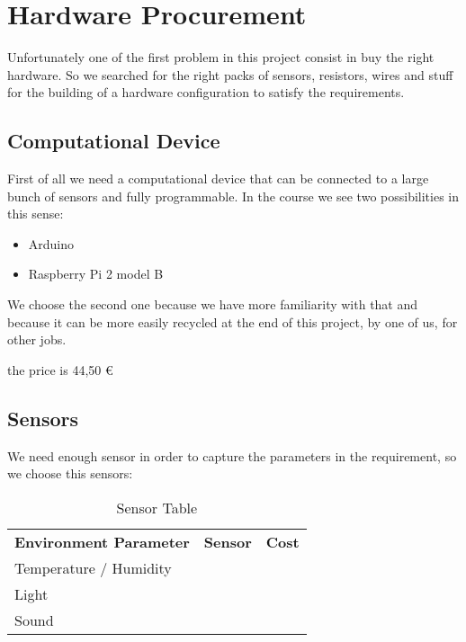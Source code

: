 \section{Hardware Procurement}

Unfortunately one of the first problem in this project consist in buy the right hardware. So we searched for the right packs of sensors, resistors, wires and stuff for the building of a hardware configuration to satisfy the requirements.

\subsection{Computational Device}

First of all we need a computational device that can be connected to a large bunch of sensors and fully programmable. In the course we see two possibilities in this sense:
\begin{itemize}
  \item Arduino
  \item Raspberry Pi 2 model B
\end{itemize}

We choose the second one because we have more familiarity with that and because it can be more easily recycled at the end of this project, by one of us, for other jobs.

the price is 44,50 \euro

\subsection{Sensors}

We need enough sensor in order to capture the parameters in the requirement, so we choose this sensors:

\begin{table}[]
\centering
\begin{tabular}{lll}
\cline{1-1}
\multicolumn{1}{|c|}{\textbf{Environment Parameter}} & \multicolumn{1}{c}{\textbf{Sensor}} & \multicolumn{1}{c}{\textbf{Cost}} \\ \cline{1-1}
Temperature / Humidity                               &                                     &                                   \\
Light                                                &                                     &                                   \\
Sound                                                &                                     &                                  
\end{tabular}
\caption{Sensor Table}
\label{Sensor Table}
\end{table}

